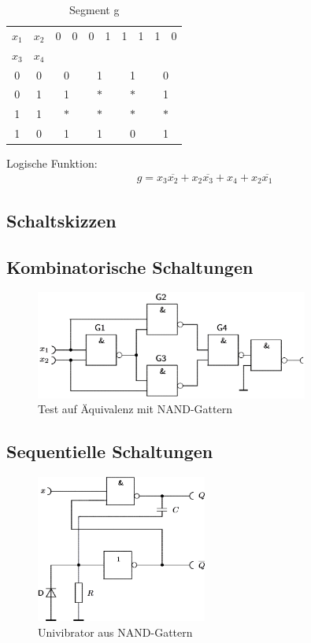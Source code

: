 \documentclass[numbers=noenddot,12pt,a4paper]{scrartcl}
\newcommand{\nicht}[1]{\overline{#1}}
\begin{document}
\begin{table}[H]
\centering
\begin{tabular}{cc||cc|cc|cc|cc}
$x_1$ & $x_2$ & 0 & 0 & 0 & 1 & 1 & 1 & 1 & 0 \\ \cline{0-1} 
$x_3$ & $x_4$ & & & & & & & & \\ \cline{1-10}
0 & 0 & \multicolumn{2}{|c|}{0} & \multicolumn{2}{|c|}{1} & \multicolumn{2}{|c|}{1} & \multicolumn{2}{|c}{0} \\
0 & 1 & \multicolumn{2}{|c|}{1} & \multicolumn{2}{|c|}{$\ast$} & \multicolumn{2}{|c|}{$\ast$} & \multicolumn{2}{|c}{1} \\ 
1 & 1 & \multicolumn{2}{|c|}{$\ast$} & \multicolumn{2}{|c|}{$\ast$} & \multicolumn{2}{|c|}{$\ast$} & \multicolumn{2}{|c}{$\ast$} \\ 
1 & 0 & \multicolumn{2}{|c|}{1} & \multicolumn{2}{|c|}{1} & \multicolumn{2}{|c|}{0} & \multicolumn{2}{|c}{1} \\ 
\end{tabular}
\caption{Segment g}
\end{table}
Logische Funktion:
\begin{align}
g=  x_3 \nicht{x_2}+ x_2 \nicht{x_3} + x_4 + x_2\nicht{x_1}
\end{align}

\subsection{Schaltskizzen}
\subsection{Kombinatorische Schaltungen}
\begin{figure}[H]
\centering
\includegraphics[width=0.8\textwidth]{gleichheit.png}
\caption{Test auf Äquivalenz mit NAND-Gattern}
\end{figure}
\subsection{Sequentielle Schaltungen}
\begin{figure}[H]
\centering
\includegraphics[width=0.5\textwidth]{univibrator.png}
\caption{Univibrator aus NAND-Gattern}
\end{figure}
\end{document}
